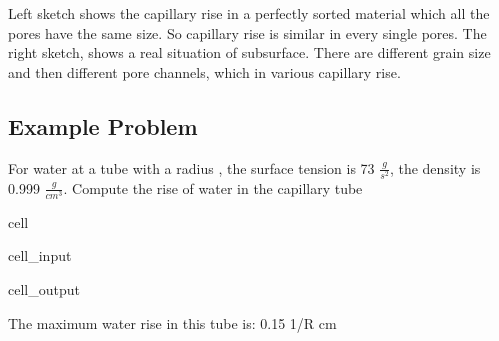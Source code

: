 \documentclass[letterpaper,10pt,english]{jupyterBook}
\let\sphinxpxdimen\pdfpxdimen\else\newdimen\sphinxpxdimen
\begin{document}
\noindent{\hspace*{\fill}\sphinxincludegraphics[width=200\sphinxpxdimen]{{L02_fig14}.png}\hspace*{\fill}}

\sphinxAtStartPar
Left sketch shows the capillary rise in a perfectly sorted material which all the pores have the same size. So capillary rise is similar in every single pores. The right sketch, shows a real situation of subsurface. There are different grain size and then different pore channels, which  in various capillary rise.


\subsection{Example Problem}
\label{\detokenize{content/flow/12_subsurface_structure:id10}}
\sphinxAtStartPar
For water at a tube with a radius , the surface tension is 73 \(\frac{g}{s^2}\), the density is 0.999 \(\frac{g}{cm^3}\). Compute the rise of water in the capillary tube

\begin{sphinxuseclass}{cell}\begin{sphinxVerbatimInput}

\begin{sphinxuseclass}{cell_input}
\begin{sphinxVerbatim}[commandchars=\\\{\}]
  
  
 


\end{sphinxVerbatim}

\end{sphinxuseclass}\end{sphinxVerbatimInput}
\begin{sphinxVerbatimOutput}

\begin{sphinxuseclass}{cell_output}
\begin{sphinxVerbatim}[commandchars=\\\{\}]
The maximum water rise in this tube is: 0.15 1/R cm
\end{sphinxVerbatim}

\end{sphinxuseclass}\end{sphinxVerbatimOutput}

\end{sphinxuseclass}
\end{document}
